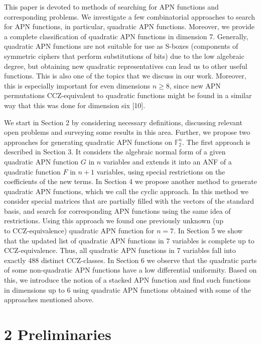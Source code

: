 \documentclass[10pt]{article}
\begin{document}
This paper is devoted to methods of searching for APN functions and corresponding problems. We investigate a few combinatorial approaches to search for APN functions, in particular, quadratic APN functions. Moreover, we provide a complete classification of quadratic APN functions in dimension 7. Generally, quadratic APN functions are not suitable for use as S-boxes (components of symmetric ciphers that perform substitutions of bits) due to the low algebraic degree, but obtaining new quadratic representatives can lead us to other useful functions. This is also one of the topics that we discuss in our work. Moreover, this is especially important for even dimensions $n \geqslant 8$, since new APN permutations CCZ-equivalent to quadratic functions might be found in a similar way that this was done for dimension six [10].

We start in Section 2 by considering necessary definitions, discussing relevant open problems and surveying some results in this area. Further, we propose two approaches for generating quadratic APN functions on $\mathbb{F}_{2}^{n}$. The first approach is described in Section 3. It considers the algebraic normal form of a given quadratic APN function $G$ in $n$ variables and extends it into an ANF of a quadratic function $F$ in $n+1$ variables, using special restrictions on the coefficients of the new terms. In Section 4 we propose another method to generate quadratic APN functions, which we call the cyclic approach. In this method we consider special matrices that are partially filled with the vectors of the standard basis, and search for corresponding APN functions using the same idea of restrictions. Using this approach we found one previously unknown (up\\
to CCZ-equivalence) quadratic APN function for $n=7$. In Section 5 we show that the updated list of quadratic APN functions in 7 variables is complete up to CCZ-equivalence. Thus, all quadratic APN functions in 7 variables fall into exactly 488 distinct CCZ-classes. In Section 6 we observe that the quadratic parts of some non-quadratic APN functions have a low differential uniformity. Based on this, we introduce the notion of a stacked APN function and find such functions in dimensions up to 6 using quadratic APN functions obtained with some of the approaches mentioned above.

\section*{2 Preliminaries}
\end{document}
